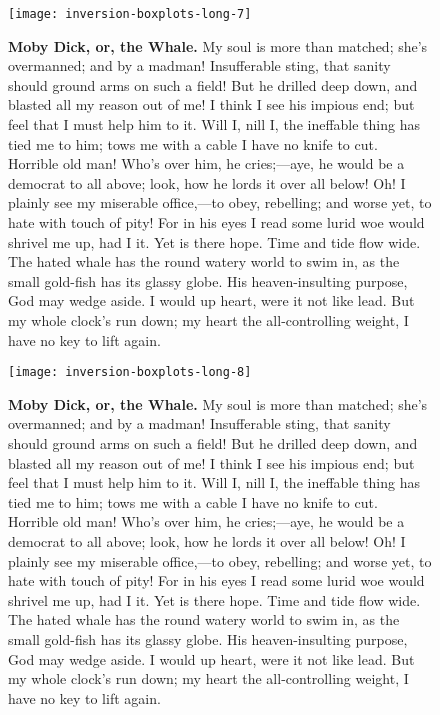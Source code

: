 \documentclass{article}
\begin{document}
\begin{figure}[!htp]
  \begin{center}
      \texttt{[image: inversion-boxplots-long-7]}
    \caption{
        \textbf{Moby Dick, or, the Whale.}
My soul is more than matched; she's overmanned; and by a madman! Insufferable sting, that sanity should ground arms on such a field! But he drilled deep down, and blasted all my reason out of me! I think I see his impious end; but feel that I must help him to it. Will I, nill I, the ineffable thing has tied me to him; tows me with a cable I have no knife to cut. Horrible old man! Who's over him, he cries;—aye, he would be a democrat to all above; look, how he lords it over all below! Oh! I plainly see my miserable office,—to obey, rebelling; and worse yet, to hate with touch of pity! For in his eyes I read some lurid woe would shrivel me up, had I it. Yet is there hope. Time and tide flow wide. The hated whale has the round watery world to swim in, as the small gold-fish has its glassy globe. His heaven-insulting purpose, God may wedge aside. I would up heart, were it not like lead. But my whole clock's run down; my heart the all-controlling weight, I have no key to lift again. 
    }
  \end{center}
\end{figure}

\begin{figure}[!htp]
  \begin{center}
      \texttt{[image: inversion-boxplots-long-8]}
    \caption{
        \textbf{Moby Dick, or, the Whale.}
My soul is more than matched; she's overmanned; and by a madman! Insufferable sting, that sanity should ground arms on such a field! But he drilled deep down, and blasted all my reason out of me! I think I see his impious end; but feel that I must help him to it. Will I, nill I, the ineffable thing has tied me to him; tows me with a cable I have no knife to cut. Horrible old man! Who's over him, he cries;—aye, he would be a democrat to all above; look, how he lords it over all below! Oh! I plainly see my miserable office,—to obey, rebelling; and worse yet, to hate with touch of pity! For in his eyes I read some lurid woe would shrivel me up, had I it. Yet is there hope. Time and tide flow wide. The hated whale has the round watery world to swim in, as the small gold-fish has its glassy globe. His heaven-insulting purpose, God may wedge aside. I would up heart, were it not like lead. But my whole clock's run down; my heart the all-controlling weight, I have no key to lift again. 
    }
  \end{center}
\end{figure}
\end{document}
